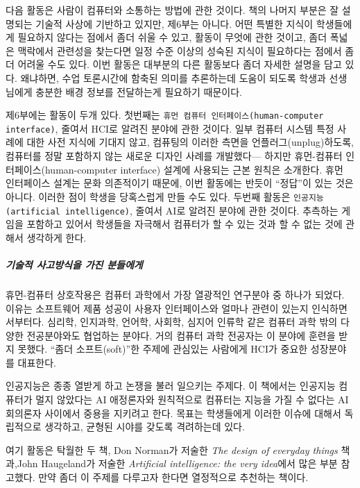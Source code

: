 \documentclass[]{article}
\begin{document}
다음 활동은 사람이 컴퓨터와 소통하는 방법에 관한 것이다. 책의 나머지
부분은 잘 설명되는 기술적 사상에 기반하고 있지만, 제6부는 아니다. 어떤
특별한 지식이 학생들에게 필요하지 않다는 점에서 좀더 쉬울 수 있고,
활동이 무엇에 관한 것이고, 좀더 폭넓은 맥락에서 관련성을 찾는다면 일정
수준 이상의 성숙된 지식이 필요하다는 점에서 좀더 어려울 수도 있다. 이번
활동은 대부분의 다른 활동보다 좀더 자세한 설명을 담고 있다. 왜냐하면,
수업 토론시간에 함축된 의미를 추론하는데 도움이 되도록 학생과 선생님에게
충분한 배경 정보를 전달하는게 필요하기 때문이다.

제6부에는 활동이 두개 있다. 첫번째는
\texttt{휴먼 컴퓨터 인터페이스(human-computer interface)}, 줄여서 HCI로
알려진 분야에 관한 것이다. 일부 컴퓨터 시스템 특정 사례에 대한 사전
지식에 기대지 않고, 컴퓨팅의 이러한 측면을 언플러그(unplug)하도록,
컴퓨터를 정말 포함하지 않는 새로운 디자인 사례를 개발했다--- 하지만
휴먼-컴퓨터 인터페이스(human-computer interface) 설계에 사용되는 근본
원칙은 소개한다. 휴먼 인터페이스 설계는 문화 의존적이기 때문에, 이번
활동에는 반듯이 ``정답''이 있는 것은 아니다. 이러한 점이 학생을
당혹스럽게 만들 수도 있다. 두번째 활동은
\texttt{인공지능(artificial intelligence)}, 줄여서 AI로 알려진 분야에
관한 것이다. 추측하는 게임을 포함하고 있어서 학생들을 자극해서 컴퓨터가
할 수 있는 것과 할 수 없는 것에 관해서 생각하게 한다.

\subparagraph{기술적 사고방식을 가진 분들에게}\label{section-257}

휴먼-컴퓨터 상호작용은 컴퓨터 과학에서 가장 열광적인 연구분야 중 하나가
되었다. 이유는 소프트웨어 제품 성공이 사용자 인터페이스와 얼마나 관련이
있는지 인식하면서부터다. 심리학, 인지과학, 언어학, 사회학, 심지어 인류학
같은 컴퓨터 과학 밖의 다양한 전공분야와도 협업하는 분야다. 거의 컴퓨터
과학 전공자는 이 분야에 훈련을 받지 못했다. ``좀더 소프트(soft)''한
주제에 관심있는 사람에게 HCI가 중요한 성장분야를 대표한다.

인공지능은 종종 열받게 하고 논쟁을 불러 일으키는 주제다. 이 책에서는
인공지능 컴퓨터가 멀지 않았다는 AI 애정론자와 원칙적으로 컴퓨터는 지능을
가질 수 없다는 AI 회의론자 사이에서 중용을 지키려고 한다. 목표는
학생들에게 이러한 이슈에 대해서 독립적으로 생각하고, 균형된 시야를
갖도록 격려하는데 있다.

여기 활동은 탁월한 두 책, Don Norman가 저술한 \emph{The design of
everyday things} 책과,John Haugeland가 저술한 \emph{Artificial
intelligence: the very idea}에서 많은 부분 참고했다. 만약 좀더 이 주제를
다루고자 한다면 열정적으로 추천하는 책이다.
\end{document}
